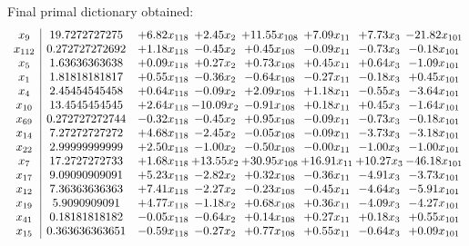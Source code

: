 \documentclass[8pt]{article}
\begin{document}
 Final primal dictionary obtained: 
\[\begin{array}{c| c c@{\hskip 2pt} c@{\hskip 2pt} c@{\hskip 2pt} c@{\hskip 2pt} c@{\hskip 2pt} c@{\hskip 2pt} }
 x_{9}   &  19.7272727275 & +  6.82 x_{118} & +  2.45 x_{2} & + 11.55 x_{108} & +  7.09 x_{11} & +  7.73 x_{3} & -21.82 x_{101}\\
 x_{112}   &  0.272727272692 & +  1.18 x_{118} & -0.45 x_{2} & +  0.45 x_{108} & -0.09 x_{11} & -0.73 x_{3} & -0.18 x_{101}\\
 x_{5}   &  1.63636363638 & +  0.09 x_{118} & +  0.27 x_{2} & +  0.73 x_{108} & +  0.45 x_{11} & +  0.64 x_{3} & -1.09 x_{101}\\
 x_{1}   &  1.81818181817 & +  0.55 x_{118} & -0.36 x_{2} & -0.64 x_{108} & -0.27 x_{11} & -0.18 x_{3} & +  0.45 x_{101}\\
 x_{4}   &  2.45454545458 & +  0.64 x_{118} & -0.09 x_{2} & +  2.09 x_{108} & +  1.18 x_{11} & -0.55 x_{3} & -3.64 x_{101}\\
 x_{10}   &  13.4545454545 & +  2.64 x_{118} & -10.09 x_{2} & -0.91 x_{108} & +  0.18 x_{11} & +  0.45 x_{3} & -1.64 x_{101}\\
 x_{69}   &  0.272727272744 & -0.32 x_{118} & -0.45 x_{2} & +  0.95 x_{108} & -0.09 x_{11} & -0.73 x_{3} & -0.18 x_{101}\\
 x_{14}   &  7.27272727272 & +  4.68 x_{118} & -2.45 x_{2} & -0.05 x_{108} & -0.09 x_{11} & -3.73 x_{3} & -3.18 x_{101}\\
 x_{22}   &  2.99999999999 & +  2.50 x_{118} & -1.00 x_{2} & -0.50 x_{108} & -0.00 x_{11} & -1.00 x_{3} & -1.00 x_{101}\\
 x_{7}   &  17.2727272733 & +  1.68 x_{118} & + 13.55 x_{2} & + 30.95 x_{108} & + 16.91 x_{11} & + 10.27 x_{3} & -46.18 x_{101}\\
 x_{17}   &  9.09090909091 & +  5.23 x_{118} & -2.82 x_{2} & +  0.32 x_{108} & -0.36 x_{11} & -4.91 x_{3} & -3.73 x_{101}\\
 x_{12}   &  7.36363636363 & +  7.41 x_{118} & -2.27 x_{2} & -0.23 x_{108} & -0.45 x_{11} & -4.64 x_{3} & -5.91 x_{101}\\
 x_{19}   &  5.9090909091 & +  4.77 x_{118} & -1.18 x_{2} & +  0.68 x_{108} & +  0.36 x_{11} & -4.09 x_{3} & -4.27 x_{101}\\
 x_{41}   &  0.18181818182 & -0.05 x_{118} & -0.64 x_{2} & +  0.14 x_{108} & +  0.27 x_{11} & +  0.18 x_{3} & +  0.55 x_{101}\\
 x_{15}   &  0.363636363651 & -0.59 x_{118} & -0.27 x_{2} & +  0.77 x_{108} & +  0.55 x_{11} & -0.64 x_{3} & +  0.09 x_{101}\\

\end{array}\]
\end{document}
